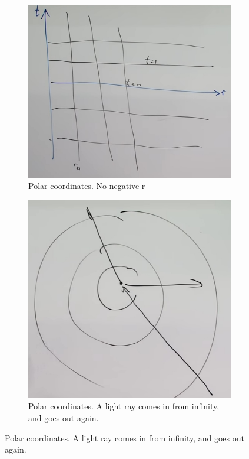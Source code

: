 \documentclass[]{article}
\begin{document}
{\begin{figure}[H]
	\begin{center}
		\caption{Radial Symmetry}
		\begin{subfigure}[t]{0.3\textwidth}
			\caption{Polar coordinates. No negative r}\label{fig:gr-8-radial-symmetry}
			\includegraphics[width=\textwidth]{gr-8-radial-symmetry}
		\end{subfigure}
		\begin{subfigure}[t]{0.3\textwidth}
			\caption{Polar coordinates. A light ray comes in from infinity, and goes out again.}\label{fig:gr-8-radial-symmetry-light-ray}
			\includegraphics[width=\textwidth]{gr-8-radial-symmetry-light-ray}

\end{subfigure}
\end{center}
\end{figure}}
\end{document}
